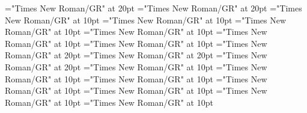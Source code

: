 \documentclass[a4paper]{article}
\begin{document}
\pagestyle{plain}
\sloppy
\setlength{\parfillskip}{0pt plus 1fil}
\font\pronunciationenUKpronunciationbefore="Times New Roman/GR" at 20pt
\font\pronunciationenUSpronunciationbefore="Times New Roman/GR" at 20pt
\font\sectionletterdictionary="Times New Roman/GR" at 10pt
\font\headsectionletterdictionary="Times New Roman/GR" at 10pt
\font\articledictionary="Times New Roman/GR" at 10pt
\font\firstoftypeheadwordlastoftypearticledictionary="Times New Roman/GR" at 10pt
\font\firstoftypegrammarrequireslastoftypearticledictionary="Times New Roman/GR" at 10pt
\font\firstoftypelastoftyperelationsynonymarticledictionary="Times New Roman/GR" at 10pt
\font\firstoftypepronunciationenUKarticledictionary="Times New Roman/GR" at 20pt
\font\lastoftypepronunciationenUSarticledictionary="Times New Roman/GR" at 20pt
\font\lastoftypepronunciationenUKarticledictionary="Times New Roman/GR" at 20pt
\font\firstoftypegrammarcategorylastoftypearticledictionary="Times New Roman/GR" at 10pt
\font{}="Times New Roman/GR" at 10pt
\font\firstoftypelastoftypenotearticledictionary="Times New Roman/GR" at 10pt
\font\exampleusefirstoftypearticledictionary="Times New Roman/GR" at 10pt
\font\examplefirstoftypearticledictionary="Times New Roman/GR" at 10pt
\font\exampleuselastoftypearticledictionary="Times New Roman/GR" at 10pt
\font\examplelastoftypearticledictionary="Times New Roman/GR" at 10pt

\mbox{} 
\newpage 
\newpage 
\setcounter{page}{1} 
\pagestyle{fancy} 


\end{document}

